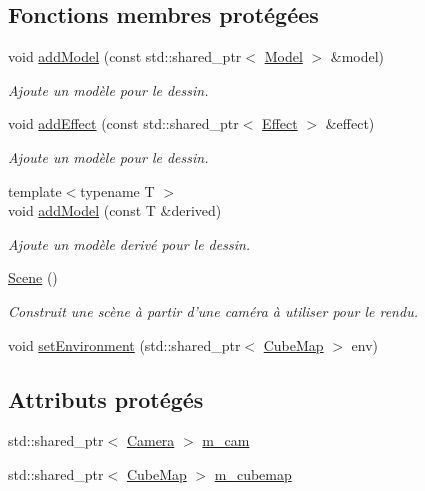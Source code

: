 \subsection*{Fonctions membres protégées}
\begin{DoxyCompactItemize}
\item 
void \hyperlink{classScene_ac4808547bb8fffe4c5a141b6f5fb663d}{add\+Model} (const std\+::shared\+\_\+ptr$<$ \hyperlink{classModel}{Model} $>$ \&model)
\begin{DoxyCompactList}\small\item\em Ajoute un modèle pour le dessin. \end{DoxyCompactList}\item 
void \hyperlink{classScene_a3b4074c80a9e1b88dbad8649c7254c2e}{add\+Effect} (const std\+::shared\+\_\+ptr$<$ \hyperlink{classEffect}{Effect} $>$ \&effect)
\begin{DoxyCompactList}\small\item\em Ajoute un modèle pour le dessin. \end{DoxyCompactList}\item 
{\footnotesize template$<$typename T $>$ }\\void \hyperlink{classScene_a3172e9ea37b589bb8641d3d42cfdd639}{add\+Model} (const T \&derived)
\begin{DoxyCompactList}\small\item\em Ajoute un modèle derivé pour le dessin. \end{DoxyCompactList}\item 
\hyperlink{classScene_ad10176d75a9cc0da56626f682d083507}{Scene} ()
\begin{DoxyCompactList}\small\item\em Construit une scène à partir d'une caméra à utiliser pour le rendu. \end{DoxyCompactList}\item 
void \hyperlink{classScene_ae0041c969f0aef8e0dd4dadfc4d3a82f}{set\+Environment} (std\+::shared\+\_\+ptr$<$ \hyperlink{classCubeMap}{Cube\+Map} $>$ env)
\end{DoxyCompactItemize}
\subsection*{Attributs protégés}
\begin{DoxyCompactItemize}
\item 
std\+::shared\+\_\+ptr$<$ \hyperlink{classCamera}{Camera} $>$ \hyperlink{classScene_ac8ac592b03402f99a2890df2603ae459}{m\+\_\+cam}
\item 
std\+::shared\+\_\+ptr$<$ \hyperlink{classCubeMap}{Cube\+Map} $>$ \hyperlink{classScene_a8424193126f3a58c21a5fe4281ed9231}{m\+\_\+cubemap}
\end{DoxyCompactItemize}


